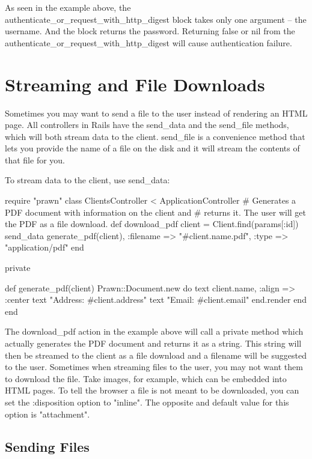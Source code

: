\documentclass[10pt]{book}
\newenvironment{code}{%
  \scriptsize
    \verbatim
}{%
    \endverbatim
    \newline
}
\begin{document}
As seen in the example above, the \\ authenticate\_or\_request\_with\_http\_digest block takes only one argument – the username. And the block returns the password. Returning false or nil from the authenticate\_or\_request\_with\_http\_digest will cause authentication failure.

\section{ Streaming and File Downloads}

Sometimes you may want to send a file to the user instead of rendering an HTML page. All controllers in Rails have the send\_data and the send\_file methods, which will both stream data to the client. send\_file  is a convenience method that lets you provide the name of a file on the  disk and it will stream the contents of that file for you.

To stream data to the client, use send\_data:
\begin{code}
require "prawn"
class ClientsController < ApplicationController
  # Generates a PDF document with information on the client and
  # returns it. The user will get the PDF as a file download.
  def download_pdf
    client = Client.find(params[:id])
    send_data generate_pdf(client),
              :filename => "#{client.name}.pdf",
              :type => "application/pdf"
  end
 
  private
 
  def generate_pdf(client)
    Prawn::Document.new do
      text client.name, :align => :center
      text "Address: #{client.address}"
      text "Email: #{client.email}"
    end.render
  end
end
\end{code}

The download\_pdf action in the example above will call a private method which actually generates the PDF  document and returns it as a string. This string will then be streamed  to the client as a file download and a filename will be suggested to the  user. Sometimes when streaming files to the user, you may not want them  to download the file. Take images, for example, which can be embedded  into HTML pages. To tell the browser a file is not meant to be downloaded, you can set the :disposition option to "inline". The opposite and default value for this option is "attachment".

\subsection{ Sending Files}
\end{document}
